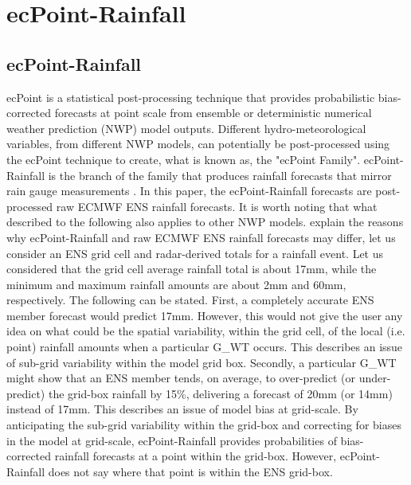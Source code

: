 \documentclass[twocol]{ametsocV5} %
\begin{document}
\section{ecPoint-Rainfall}
\subsection{ecPoint-Rainfall}
ecPoint is a statistical post-processing technique that provides probabilistic bias-corrected forecasts at point scale from ensemble or deterministic numerical weather prediction (NWP) model outputs. Different hydro-meteorological variables, from different NWP models, can potentially be post-processed using the ecPoint technique to create, what is known as, the "ecPoint Family". ecPoint-Rainfall is the branch of the family that produces rainfall forecasts that mirror rain gauge measurements \citep{Hewson2020a}. In this paper, the ecPoint-Rainfall forecasts are post-processed raw ECMWF ENS rainfall forecasts. It is worth noting that what described to the following also applies to other NWP models. \parTo explain the reasons why ecPoint-Rainfall and raw ECMWF ENS rainfall forecasts may differ, let us consider an ENS grid cell and radar-derived totals for a rainfall event. Let us considered that the grid cell average rainfall total is about 17mm, while the minimum and maximum rainfall amounts are about 2mm and 60mm, respectively. The following can be stated. First, a completely accurate ENS member forecast would predict 17mm. However, this would not give the user any idea on what could be the spatial variability, within the grid cell, of the local (i.e. point) rainfall amounts when a particular G\_WT occurs. This describes an issue of sub-grid variability within the model grid box. Secondly, a particular G\_WT might show that an ENS member tends, on average, to over-predict (or under-predict) the grid-box rainfall by 15\%, delivering a forecast of 20mm (or 14mm) instead of 17mm. This describes an issue of model bias at grid-scale. By anticipating the sub-grid variability within the grid-box and correcting for biases in the model at grid-scale, ecPoint-Rainfall provides probabilities of bias-corrected rainfall forecasts at a point within the grid-box. However, ecPoint-Rainfall does not say where that point is within the ENS grid-box. \par
\end{document}
